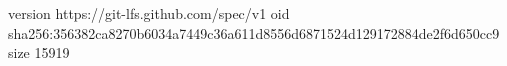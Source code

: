 version https://git-lfs.github.com/spec/v1
oid sha256:356382ca8270b6034a7449c36a611d8556d6871524d129172884de2f6d650cc9
size 15919
